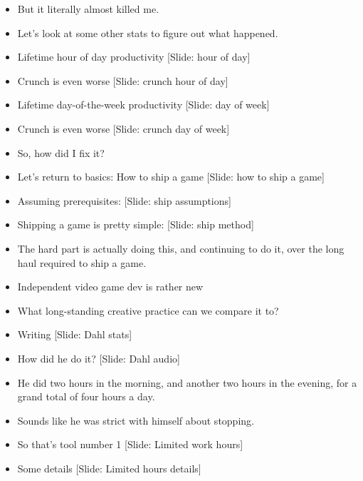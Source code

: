 \documentclass[12pt]{article}
\begin{document}
{\begin{itemize}
\item But it literally almost killed me.

\item Let's look at some other stats to figure out what happened.

\item Lifetime hour of day productivity [Slide: hour of day]

\item Crunch is even worse [Slide: crunch hour of day]

\item Lifetime day-of-the-week productivity [Slide: day of week]

\item Crunch is even worse [Slide: crunch day of week]

\item So, how did I fix it?

\item Let's return to basics:  How to ship a game [Slide: how to ship a game]

\item Assuming prerequisites:  [Slide: ship assumptions]

\item Shipping a game is pretty simple:  [Slide: ship method]

\item The hard part is actually doing this, and continuing to do it, over the long haul required to ship a game.

\item Independent video game dev is rather new

\item What long-standing creative practice can we compare it to?

\item Writing [Slide:  Dahl stats]

\item How did he do it? [Slide:  Dahl audio]

\item He did two hours in the morning, and another two hours in the evening, for a grand total of four hours a day.

\item Sounds like he was strict with himself about stopping.

\item So that's tool number 1 [Slide:  Limited work hours]

\item Some details [Slide: Limited hours details]


\end{itemize}}
\end{document}
